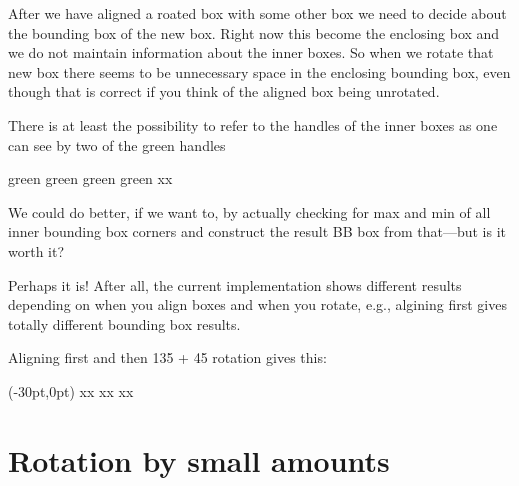 \documentclass{article}
\newcommand\cbox[2][.8]{{\setlength\fboxsep{0pt}\colorbox[gray]{#1}{#2}}}
\begin{document}
After we have aligned a roated box with some other box we need to decide about
the bounding box of the new box. Right now this become the enclosing box and
we do not maintain information about the inner boxes. So when we rotate that
new box there seems to be unnecessary space in the enclosing bounding box,
even though that is correct if you think of the aligned box being unrotated.

There is at least the possibility to refer to the handles of the inner boxes
as one can see by two of the green handles

\medskip

\rotatecoffin {}
\displaycoffinhandle {} {green}
\displaycoffinhandle {} {green}
\displaycoffinhandle {} {green}
\displaycoffinhandle {} {green}
x\cbox{\usebox \aaa }x

We could do better, if we want to, by actually checking for max and
min of all inner bounding box corners and construct the result BB box from
that---but is it worth it?

Perhaps it is! After all, the current implementation shows different results
depending on when you align boxes and when you rotate, e.g., algining first
gives totally different bounding box results. 

\newpage

Aligning first and then 135 + 45 rotation gives this:

\sbox {}
\sbox {}
\rotatecoffin {}

\aligncoffins \aaa [b,l] \bbb[B,hc](-30pt,0pt)
x\cbox{\usebox \aaa }x
\qquad
\rotatecoffin {}
x\cbox{\usebox \aaa }x
\qquad
\rotatecoffin {}
x\cbox{\usebox \aaa }x




\newpage

\section{Rotation by small amounts}
\end{document}

